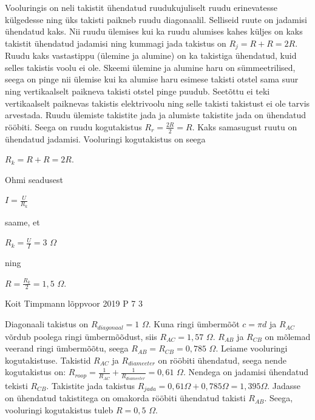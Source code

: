 \documentclass[11pt]{article}
\begin{document}
{{\ifSolution
Vooluringis on neli takistit ühendatud ruudukujuliselt ruudu erinevatesse külgedesse ning üks takisti paikneb ruudu diagonaalil. Selliseid ruute on jadamisi ühendatud kaks. Nii ruudu ülemises kui ka ruudu alumises kahes küljes on kaks takistit ühendatud jadamisi ning kummagi jada takistus on $R_j = R + R = 2R$. Ruudu kaks vastastippu (ülemine ja alumine) on ka takistiga ühendatud, kuid selles takistis voolu ei ole. Skeemi ülemine ja alumine haru on sümmeetrilised, seega on pinge nii ülemise kui ka alumise haru esimese takisti otstel sama suur ning vertikaalselt paikneva takisti otstel pinge puudub. Seetõttu ei teki vertikaalselt paiknevas takistis elektrivoolu ning selle takisti takistust ei ole tarvis arvestada. Ruudu ülemiste takistite jada ja alumiste takistite jada on ühendatud rööbiti. Seega on ruudu kogutakistus $R_r =\frac{2R}{2}= R$. Kaks samasugust ruutu on ühendatud jadamisi. Vooluringi kogutakistus on seega
\begin{center}
$R_k = R + R = 2R$.
\end{center}
Ohmi seadusest
\begin{center}
$I = \frac{U}{R_k}$ 
\end{center}
saame, et
\begin{center}
$R_k = \frac{U}{I} = 3$ $\Omega$ 
\end{center}
ning
\begin{center}
$R = \frac{R_k}{2} = 1,5$ $\Omega$.
\end{center}
\fi
}

{Koit Timpmann} %
{lõppvoor} %
{2019} %
{P 7} %
{3} %
{

\ifSolution
Diagonaali takistus on $R_{diagonaal} = 1$ $\Omega$.
Kuna ringi ümbermõõt $c = \pi d$ ja $R_{AC}$ võrdub poolega ringi ümbermõõdust, siis $R_{AC} = 1,57$ $\Omega$.
$R_{AB}$ ja $R_{CB}$ on mõlemad veerand ringi ümbermõõtu, seega $R_{AB} = R_{CB} = 0,785$ $\Omega$.
Leiame vooluringi kogutakistuse. Takistid $R_{AC}$ ja $R_{diameeter}$ on rööbiti ühendatud, seega nende kogutakistus on:
$R_{roop} = \frac{1}{R_{AC}} + \frac{1}{R_{diameeter}} = 0,61$ $\Omega$.
Nendega on jadamisi ühendatud tekisti $R_{CB}$. Takistite jada takistus $R_{jada} = 0,61 \Omega + 0,785 \Omega = 1,395 \Omega$.
Jadasse on ühendatud takistitega on omakorda rööbiti ühendatud takisti $R_{AB}$. Seega, vooluringi kogutakistus tuleb $R = 0,5$ $\Omega$.

}}
\end{document}
